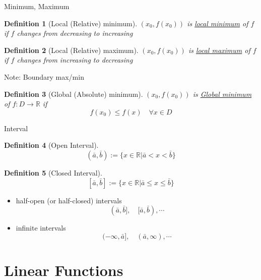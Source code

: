\documentclass[final]{beamer}
\newtheorem{defn}{Definition}
\begin{document}
\begin{frame}[t]{Minimum, Maximum}
	\begin{defn}
		[Local (Relative) minimum]
		$(x_0,f(x_0))$ is \uline{local minimum} of $f$ if $f$ changes from decreasing to increasing
	\end{defn}
	
	\begin{defn}
		[Local (Relative) maximum]
		$(x_0,f(x_0))$ is \uline{local maximum} of $f$ if $f$ changes from increasing to decreasing
	\end{defn}
	
	Note: Boundary max/min
	
	\begin{defn}
		[Global (Absolute) minimum]
		$(x_0,f(x_0))$ is \uline{Global minimum} of $f:D\rightarrow \mathbb{R}$ if \[
			f(x_0)\le f(x) \quad \forall x \in D
		\]
	\end{defn}
\end{frame}

\begin{frame}[t]{Interval}
	\begin{defn}
		[Open Interval]
		\[
			(\bar a,\bar b):=\{x\in \mathbb{R}\vert \bar a < x < \bar b \}
		\]
	\end{defn}
	
	\begin{defn}
		[Closed Interval]
		\[
			[\bar a,\bar b]:=\{x\in \mathbb{R}\vert \bar a \le x \le  \bar b \}
		\]
	\end{defn}
	
	\begin{itemize}
		\item half-open (or half-closed) intervals
		\[
			(\bar a, \bar b],\quad [\bar a, \bar b),\cdots
		\]
		\item infinite intervals
		\[
			(-\infty, \bar a],\quad (\bar a, \infty),\cdots
		\]
	\end{itemize}
\end{frame}

\section{Linear Functions} %
\label{sec:linear_functions}
\end{document}
